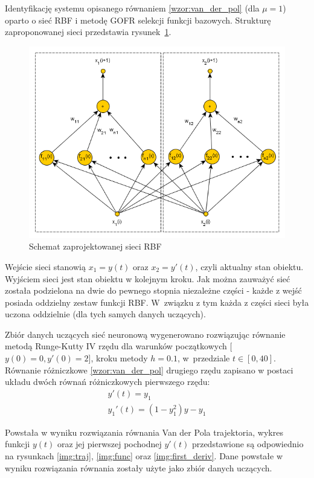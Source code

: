Identyfikację systemu opisanego równaniem \eqref{wzor:van_der_pol} (dla $\mu = 1$) oparto o sieć RBF i metodę GOFR selekcji funkcji bazowych. Strukturę zaproponowanej sieci przedstawia rysunek~\ref{fig:rbf}.
\begin{figure}[ht!]
	\centering
	
	\includegraphics[width = \textwidth]{images/rbf.png}
	\caption{Schemat zaprojektowanej sieci RBF}
	\label{fig:rbf}	

\end{figure}
Wejście sieci stanowią $x_1 = y(t)$ oraz $x_2 = y'(t)$, czyli aktualny stan obiektu. Wyjściem sieci jest stan obiektu w kolejnym kroku. Jak można zauważyć sieć została podzielona na dwie do pewnego stopnia niezależne części - każde z wejść posiada oddzielny zestaw funkcji RBF. W~związku z tym każda z części sieci była uczona oddzielnie (dla tych samych danych uczących). 

Zbiór danych uczących sieć neuronową wygenerowano rozwiązując równanie metodą Runge-Kutty IV rzędu dla warunków początkowych [$y(0)=0,y'(0)=2$], kroku metody $h=0.1$, w~przedziale $t \in [0,40]$. Równanie różniczkowe \eqref{wzor:van_der_pol} drugiego rzędu zapisano w postaci układu dwóch równań różniczkowych pierwszego rzędu:
\begin{equation}
	\begin{array}{l}
    y'(t)  = y_1 \\
    y_1'(t) = (1-y_1^2)y-y_1
    \end{array}
\end{equation}

Powstała w wyniku rozwiązania równania Van der Pola trajektoria, wykres funkcji $y(t)$ oraz jej pierwszej pochodnej $y'(t)$ przedstawione są odpowiednio na rysunkach \ref{img:traj}, \ref{img:func} oraz \ref{img:first_deriv}. Dane powstałe w wyniku rozwiązania równania zostały użyte jako zbiór danych uczących.

